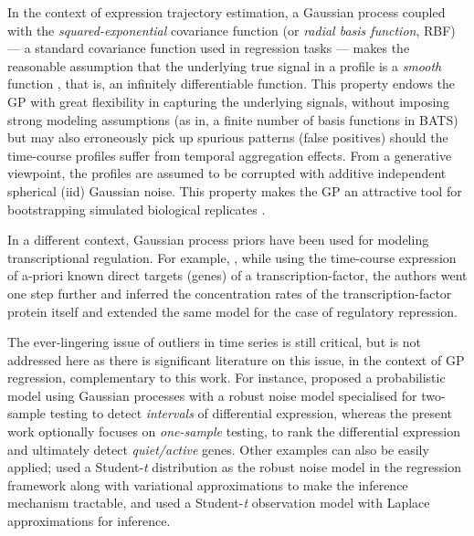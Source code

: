     In the context of expression trajectory estimation, a Gaussian process coupled
    with the \textit{squared-exponential} covariance function (or \textit{radial
    basis function}, RBF) --- a standard covariance function used in regression
    tasks --- makes the reasonable assumption that the underlying true signal in a
    profile is a \textit{smooth} function \citep{yuan2006flexible}, that is,
    an infinitely differentiable function. This property endows the GP with great
    flexibility in capturing the underlying signals, without imposing
    strong modeling assumptions (as in, a finite number of basis functions in BATS) but may
    also erroneously pick up spurious patterns (false positives) should the time-course
    profiles suffer from temporal aggregation effects. From a generative viewpoint, the
    profiles are assumed to be corrupted with additive independent spherical (iid) Gaussian noise.
    This property makes the GP an attractive tool for bootstrapping simulated
    biological replicates \citep{kirk2009gaussian}.

    In a different context, Gaussian process priors have been used for modeling
    transcriptional regulation. For example, \citet{Lawrence:modelling07}, while
    using the time-course expression of a-priori known direct targets (genes) of a
    transcription-factor, the authors went one step further and inferred the
    concentration rates of the transcription-factor protein itself and
    \citet{gao2008gaussian} extended the same model for the case of regulatory
    repression.

    The ever-lingering issue of outliers in time series is still critical, but is
    not addressed here as there is significant literature on this issue, in the
    context of GP regression, complementary to this work. For instance,
    \citet{stegle2010robust, StegleDWMMGB09} proposed a probabilistic model using
    Gaussian processes with a robust noise model specialised for two-sample testing
    to detect \textit{intervals} of differential expression, whereas the present
    work optionally focuses on \textit{one-sample} testing, to rank the differential
    expression and ultimately detect \textit{quiet/active} genes. Other examples
    can also be easily applied; \citet{Tipping:variational05} used a
    Student-\textit{t} distribution as the robust noise model in the regression
    framework along with variational approximations to make the inference
    mechanism tractable, and \citet{Vanhatalo:gaussian09} used a
    Student-\textit{t} observation model with Laplace approximations for inference.


